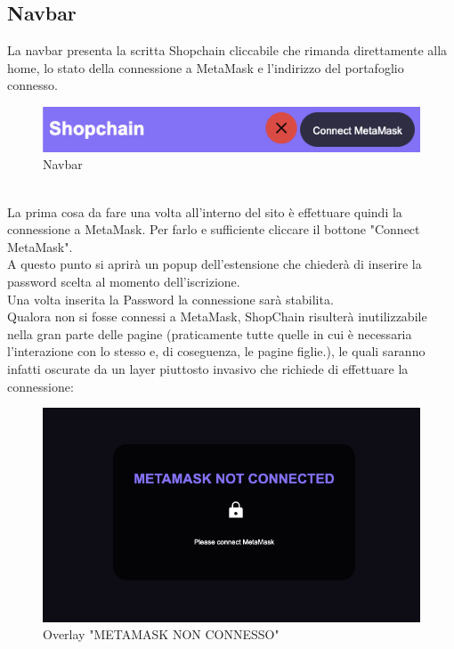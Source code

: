     \subsection{Navbar}
    La navbar presenta la scritta Shopchain cliccabile che rimanda direttamente alla home, lo stato della connessione a MetaMask e l'indirizzo del portafoglio connesso.
    \begin{figure}[H]
        \centering
        \includegraphics[scale=0.5]{immagini/navbar.png}
        \caption{Navbar}
    \end{figure}
    \textbf{}\\
    La prima cosa da fare una volta all'interno del sito è effettuare quindi la connessione a MetaMask. Per farlo e sufficiente cliccare il bottone "Connect MetaMask".\\
    A questo punto si aprirà un popup dell'estensione che chiederà di inserire la password scelta al momento dell'iscrizione.\\
    Una volta inserita la Password la connessione sarà stabilita.\\
    Qualora non si fosse connessi a MetaMask, ShopChain risulterà inutilizzabile nella gran parte delle pagine (praticamente tutte quelle in cui è necessaria l'interazione con lo stesso e, di coseguenza, le pagine figlie.), le quali saranno infatti oscurate da un layer piuttosto invasivo che richiede di effettuare la connessione:
    \begin{figure}[H]
        \centering
        \includegraphics[scale=0.4]{immagini/MetaMaskLayer.png}
        \caption{Overlay "METAMASK NON CONNESSO"}
    \end{figure}
